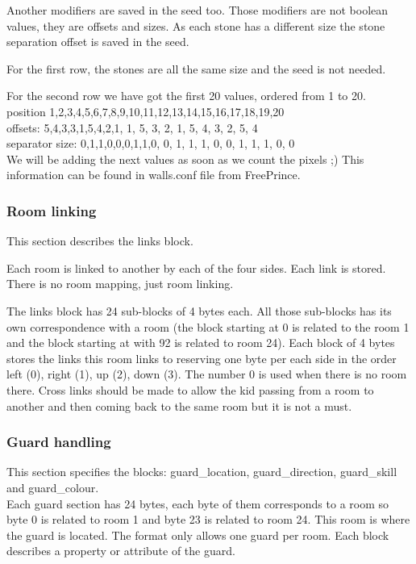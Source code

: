 \documentclass{article}
\begin{document}
 Another modifiers are saved in the seed too. Those modifiers are not
 boolean values, they are offsets and sizes. As each stone has a different
 size the stone separation offset is saved in the seed.

 For the first row, the stones are all the same size and the seed is not
 needed.

 For the second row we have got the first 20 values, ordered from 1 to 20. \\ 
 position        1,2,3,4,5,6,7,8,9,10,11,12,13,14,15,16,17,18,19,20 \\
 offsets:        5,4,3,3,1,5,4,2,1, 1, 5, 3, 2, 1, 5, 4, 3, 2, 5, 4 \\
 separator size: 0,1,1,0,0,0,1,1,0, 0, 1, 1, 1, 0, 0, 1, 1, 1, 0, 0 \\

 We will be adding the next values as soon as we count the pixels ;)
 This information can be found in walls.conf file from FreePrince.

\subsubsection{Room linking \label{room linking}} %
 This section describes the links block.

 Each room is linked to another by each of the four sides. Each link
 is stored. There is no room mapping, just room linking.

 The links block has 24 sub-blocks of 4 bytes each. All those sub-blocks
 has its own correspondence with a room (the block starting at 0 is
 related to the room 1 and the block starting at with 92 is related to
 room 24).
 Each block of 4 bytes stores the links this room links to reserving one
 byte per each side in the order left (0), right (1), up (2), down (3).
 The number 0 is used when there is no room there.
 Cross links should be made to allow the kid passing from a room to
 another and then coming back to the same room but it is not a must.

\subsubsection{Guard handling\label{guard handling}} %
 This section specifies the blocks: guard\_location, guard\_direction,
 guard\_skill and guard\_colour.\\

 Each guard section has 24 bytes, each byte of them corresponds to a room
 so byte 0 is related to room 1 and byte 23 is related to room 24.
 This room is where the guard is located. The format only allows one
 guard per room. Each block describes a property or attribute of the guard.\\
\end{document}
